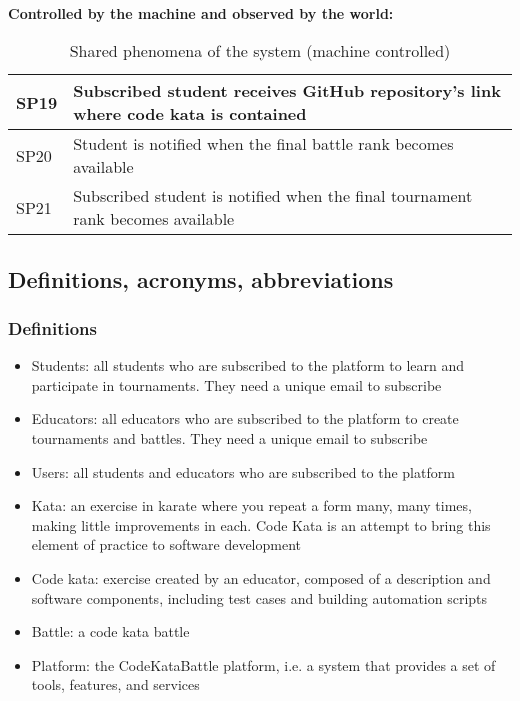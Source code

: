 \\
\textbf{Controlled by the machine and observed by the world:}
\begin{table}[h]
    \centering
    \begin{tabular}{|l|l|}
    \hline
        SP19 & Subscribed student receives GitHub repository's link where code kata is contained \\
    \hline
        SP20 & Student is notified when the final battle rank becomes available \\
    \hline
        SP21 & Subscribed student is notified when the final tournament rank becomes available \\
    \hline
    \end{tabular}
    \caption{Shared phenomena of the system (machine controlled)}
    \label{tab:goals}
\end{table}

\subsection{Definitions, acronyms, abbreviations}
\subsubsection{Definitions}
\begin{itemize}
    \item Students: all students who are subscribed to the platform to learn and participate in tournaments. They need a unique email to subscribe
    \item Educators: all educators who are subscribed to the platform to create tournaments and battles. They need a unique email to subscribe
    \item Users: all students and educators who are subscribed to the platform
    \item Kata: an exercise in karate where you repeat a form many, many times, making little improvements in each. Code Kata is an attempt to bring this element of practice to software development
    \item Code kata: exercise created by an educator, composed of a description and software components, including test cases and building automation scripts
    \item Battle: a code kata battle
    \item Platform: the CodeKataBattle platform, i.e. a system that provides a set of tools, features, and services
\end{itemize}

